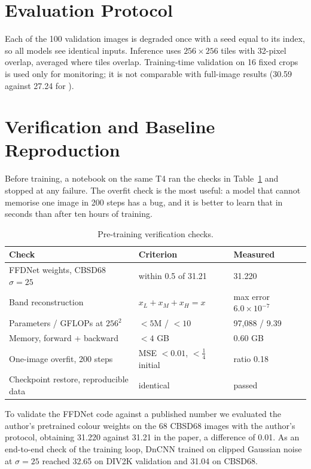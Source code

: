 \section{Evaluation Protocol}\label{sec:evalproto}

Each of the 100 validation images is degraded once with a seed equal to its
index, so all models see identical inputs. Inference uses $256\times256$
tiles with 32-pixel overlap, averaged where tiles overlap. Training-time
validation on 16 fixed crops is used only for monitoring; it is not
comparable with full-image results (30.59 against 27.24\dB{} for \fcsg{}).

\section{Verification and Baseline Reproduction}\label{sec:verification}

Before training, a notebook on the same T4 ran the checks in
Table~\ref{tab:gates} and stopped at any failure. The overfit check is the
most useful: a model that cannot memorise one image in 200 steps has a bug,
and it is better to learn that in seconds than after ten hours of training.

\begin{table}[htbp]
	\centering
	\caption{Pre-training verification checks.}
	\label{tab:gates}
	\small
	\begin{tabular}{@{}lll@{}}
		\toprule
		Check & Criterion & Measured \\
		\midrule
		FFDNet weights, CBSD68 $\sigma{=}25$ & within 0.5\dB{} of 31.21 & 31.220\dB \\
		Band reconstruction & $x_L{+}x_M{+}x_H = x$ & max error $6.0\times10^{-7}$ \\
		Parameters / GFLOPs at $256^2$ & $<5$M / $<10$ & 97,088 / 9.39 \\
		Memory, forward + backward & $< 4$ GB & 0.60 GB \\
		One-image overfit, 200 steps & MSE $<0.01$, $<\frac14$ initial & ratio 0.18 \\
		Checkpoint restore, reproducible data & identical & passed \\
		\bottomrule
	\end{tabular}
\end{table}

To validate the FFDNet code against a published number we evaluated the
author's pretrained colour weights \cite{zhang2018ffdnet} on the 68 CBSD68 images with the author's protocol, obtaining 31.220\dB{}
against 31.21\dB{} in the paper, a difference of 0.01\dB{}. As an end-to-end
check of the training loop, DnCNN trained on clipped Gaussian noise at
$\sigma=25$ reached 32.65\dB{} on DIV2K validation and 31.04\dB{} on CBSD68.
